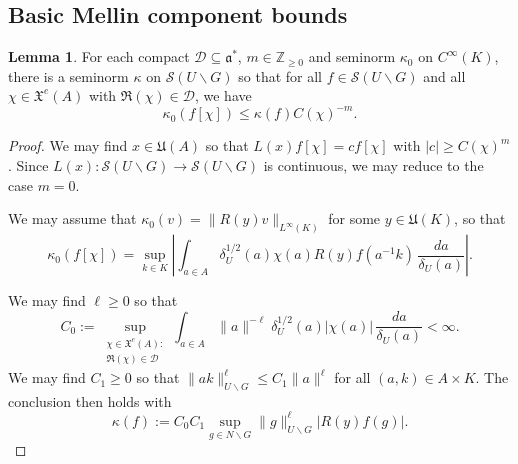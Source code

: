 \documentclass[reqno]{amsart}
\theoremstyle{plain} \newtheorem{theorem} {Theorem}
\theoremstyle{definition} \newtheorem{definition} [theorem] {Definition}
\theoremstyle{itplain} %
\newtheorem{lemma}[theorem]{Lemma}
\numberwithin{equation}{section}
\numberwithin{theorem}{section}
\renewcommand{\geq}{\geqslant}
\renewcommand{\leq}{\leqslant}
\begin{document}
\subsection{Basic Mellin component bounds}


\begin{lemma}\label{lem:standard:each-comp-mathc}
  For each compact $\mathcal{D} \subseteq \mathfrak{a}^*$, $m \in \mathbb{Z}_{\geq 0}$ and seminorm $\kappa_0$ on $C^\infty(K)$, there is a seminorm $\kappa$ on $\mathcal{S}(U \backslash G)$ so that for all $f \in \mathcal{S}(U \backslash G)$ and all $\chi \in \mathfrak{X}^e(A)$ with $\Re(\chi) \in \mathcal{D}$, we have
  \begin{equation*}
    \kappa_0(f[\chi]) \leq \kappa(f) C(\chi)^{-m}.
  \end{equation*}
\end{lemma}
\begin{proof}
  We may find $x \in \mathfrak{U}(A)$ so that $L(x) f[\chi] = c f[\chi]$ with $|c| \geq C(\chi)^{m}$.  Since $L(x) : \mathcal{S}(U \backslash G) \rightarrow \mathcal{S}(U \backslash G)$ is continuous, we may reduce to the case $m = 0$.

  We may assume that $\kappa_0(v) = \|R(y) v\|_{L^\infty(K)}$ for some $y \in \mathfrak{U}(K)$, so that
  \begin{equation*}
    \kappa_0(f[\chi]) =
    \sup _{k \in K}
    \left\lvert
      \int _{a \in A}
      \delta_U^{1/2}(a) \chi(a)
      R(y) f(a^{-1} k)
      \, \frac{d a}{\delta_U(a)}
    \right\rvert.
\end{equation*}

We may find $\ell \geq 0$ so that
\begin{equation*}
  C_0 := \sup_{
    \substack{
      \chi \in \mathfrak{X}^e(A) :  \\
       \Re(\chi) \in \mathcal{D}
    }
  }
  \int_{a \in A} \|a\|^{-\ell} \delta_U^{1/2}(a) |\chi(a)|  \, \frac{d a}{\delta_U(a)} < \infty.
\end{equation*}
We may find $C_1 \geq 0$ so that $\|a k\|_{U \backslash G}^{\ell} \leq C_1 \|a\|^{\ell}$ for all $(a,k) \in A \times K$.  The conclusion then holds with
\begin{equation*}
  \kappa(f) := C_0 C_1 \sup_{g \in N \backslash G} \|g\|_{U \backslash G}^{\ell} |R(y) f(g)|.
\end{equation*}
\end{proof}
\end{document}
